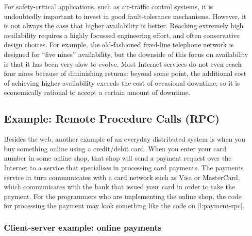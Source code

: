 
For safety-critical applications, such as air-traffic control systems, it is undoubtedly important to invest in good fault-tolerance mechanisms.
However, it is not always the case that higher availability is better.
Reaching extremely high availability requires a highly focussed engineering effort, and often conservative design choices.
For example, the old-fashioned fixed-line telephone network is designed for ``five nines'' availability, but the downside of this focus on availability is that it has been very slow to evolve.
Most Internet services do not even reach four nines because of diminishing returns: beyond some point, the additional cost of achieving higher availability exceeds the cost of occasional downtime, so it is economically rational to accept a certain amount of downtime.

\subsection{Example: Remote Procedure Calls (RPC)}\label{sec:rpc}

Besides the web, another example of an everyday distributed system is when you buy something online using a credit/debit card.
When you enter your card number in some online shop, that shop will send a payment request over the Internet to a service that specialises in processing card payments.
The payments service in turn communicates with a card network such as Visa or MasterCard, which communicates with the bank that issued your card in order to take the payment.
For the programmers who are implementing the online shop, the code for processing the payment may look something like the code on \autoref{l:payment-rpc}.

\begin{frame}
    \label{s:payment-example}
    \frametitle{Client-server example: online payments}
    \begin{center}
    \end{center}
\end{frame}


